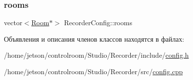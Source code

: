 \subsubsection{\texorpdfstring{rooms}{rooms}}
{\footnotesize\ttfamily vector$<$\hyperlink{class_room}{Room}$\ast$$>$ Recorder\+Config\+::rooms\hspace{0.3cm}{\ttfamily [private]}}



Объявления и описания членов классов находятся в файлах\+:\begin{DoxyCompactItemize}
\item 
/home/jetson/controlroom/\+Studio/\+Recorder/include/\hyperlink{_recorder_2include_2config_8h}{config.\+h}\item 
/home/jetson/controlroom/\+Studio/\+Recorder/src/\hyperlink{_recorder_2src_2config_8cpp}{config.\+cpp}\end{DoxyCompactItemize}
